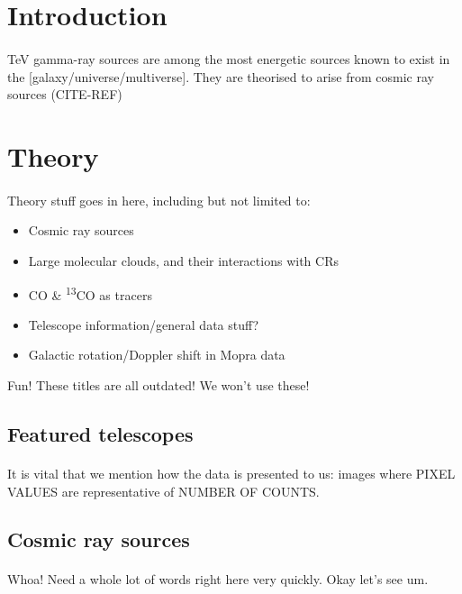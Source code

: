 \documentclass[a4paper, titlepage, oneside]{article}
\newcommand{\elem}[2]{\textsuperscript{#1}{#2}}
\begin{document}
\begin{multicols}{2}
\section{Introduction}
\paragraph{}
TeV gamma-ray sources are among the most energetic sources known to exist in the [galaxy/universe/multiverse]. They are theorised to arise from cosmic ray sources (CITE-REF)

\section{Theory}
\paragraph{}
Theory stuff goes in here, including but not limited to:
\begin{itemize}
  \item Cosmic ray sources
  \item Large molecular clouds, and their interactions with CRs
  \item CO \& \elem{13}{CO} as tracers
  \item Telescope information/general data stuff?
  \item Galactic rotation/Doppler shift in Mopra data
\end{itemize}
Fun! These titles are all outdated! We won't use these!

\subsection{Featured telescopes}
\paragraph{}
It is vital that we mention how the data is presented to us: images where PIXEL VALUES are representative of NUMBER OF COUNTS.

\subsection{Cosmic ray sources}
\paragraph{}
Whoa! Need a whole lot of words right here very quickly. Okay let's see um.


\end{multicols}
\end{document}
